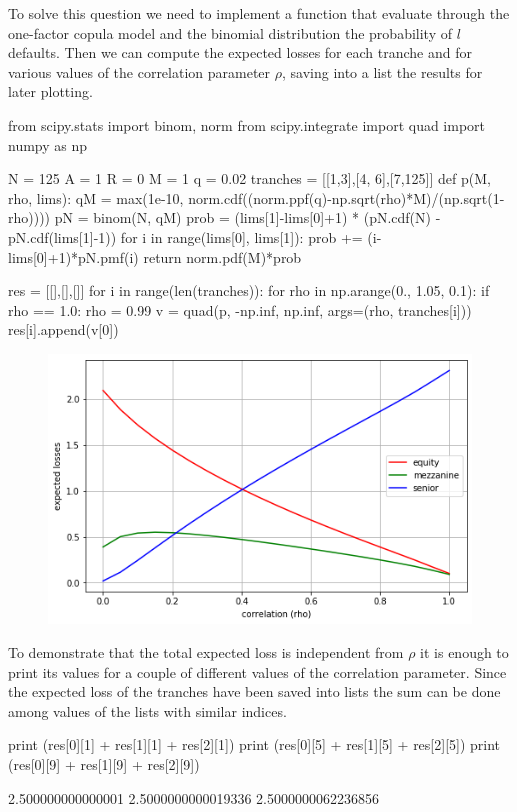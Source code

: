 \cprotEnv\begin{solution}	
To solve this question we need to implement a function that evaluate through the one-factor copula model and the binomial distribution the probability of $l$ defaults.
Then we can compute the expected losses for each tranche and for various values of the correlation parameter $\rho$, saving into a list the results for later plotting.

\begin{ipython}
from scipy.stats import binom, norm
from scipy.integrate import quad
import numpy as np

N = 125
A = 1
R = 0
M = 1
q = 0.02
tranches = [[1,3],[4, 6],[7,125]]
def p(M, rho, lims):
    qM = max(1e-10, norm.cdf((norm.ppf(q)-np.sqrt(rho)*M)/(np.sqrt(1-rho))))
    pN = binom(N, qM)
    prob = (lims[1]-lims[0]+1) * (pN.cdf(N) - pN.cdf(lims[1]-1))
    for i in range(lims[0], lims[1]):
        prob += (i-lims[0]+1)*pN.pmf(i)
    return norm.pdf(M)*prob

res = [[],[],[]]
for i in range(len(tranches)):
    for rho in np.arange(0., 1.05, 0.1):
        if rho == 1.0:
            rho = 0.99
        v = quad(p, -np.inf, np.inf, args=(rho, tranches[i]))
        res[i].append(v[0])
\end{ipython}

\begin{figure}[htbp]
\begin{center}		
\includegraphics[width=0.7\linewidth]{figures/losses_vs_rho_2}
\end{center}
\end{figure}

To demonstrate that the total expected loss is independent from $\rho$ it is enough to print its values for a couple of different values of the correlation parameter. Since the expected loss of the tranches have been saved into lists the sum can be done among values of the lists with similar indices. 

\begin{ipython}
print (res[0][1] + res[1][1] + res[2][1])
print (res[0][5] + res[1][5] + res[2][5])
print (res[0][9] + res[1][9] + res[2][9])
\end{ipython}
\begin{ioutput}
2.500000000000001
2.5000000000019336
2.5000000062236856
\end{ioutput}
\end{solution}

